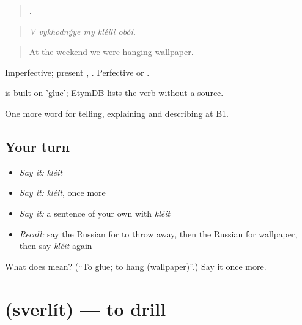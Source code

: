 \begin{quote}
    .
\end{quote}

\begin{quote}
\emph{V vykhodnýye my kléili obói.}
\end{quote}

\begin{quote}
At the weekend we were hanging wallpaper.
\end{quote}

Imperfective; present , . Perfective  or .

\begin{cousinweb}
\emph{} is built on \emph{} 'glue'; EtymDB lists the verb without a source.
\end{cousinweb}

\begin{grammarlens}[title={What you've built}]
One more word for telling, explaining and describing at B1.
\end{grammarlens}

\subsection*{Your turn}
\begin{itemize}
\raggedright
  \item \emph{Say it:} \emph{kléit}
  \item \emph{Say it:} \emph{kléit}, once more
  \item \emph{Say it:} a sentence of your own with \emph{kléit}
  \item \emph{Recall:} say the Russian for to throw away, then the Russian for wallpaper, then say \emph{kléit} again
\end{itemize}

\begin{tcolorbox}[breakable,colback=teal!4,colframe=teal!35!black,title={Before you move on}]
What does  mean? (\textquotedblleft{}To glue; to hang (wallpaper)\textquotedblright{}.) Say it once more.
\end{tcolorbox}
\section[\texorpdfstring{\ru{сверлить} (sverlít)}{сверлить (sverlít)}]{ (sverlít) — to drill}

\label{lesson:RU-C532-sverlit}



